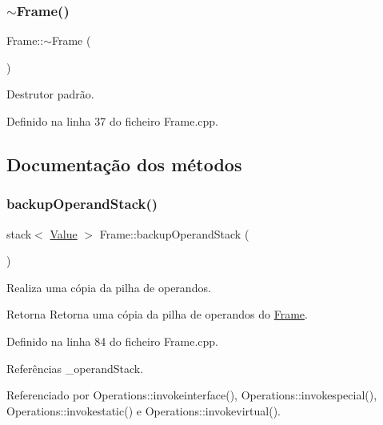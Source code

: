 \subsubsection{\texorpdfstring{$\sim$\+Frame()}{~Frame()}}
{\footnotesize\ttfamily Frame\+::$\sim$\+Frame (\begin{DoxyParamCaption}{ }\end{DoxyParamCaption})}



Destrutor padrão. 



Definido na linha 37 do ficheiro Frame.\+cpp.



\subsection{Documentação dos métodos}
\mbox{\label{classFrame_a874ac5162f805570d944a807ebf2bd40}} 
\subsubsection{\texorpdfstring{backup\+Operand\+Stack()}{backupOperandStack()}}
{\footnotesize\ttfamily stack$<$ \hyperlink{structValue}{Value} $>$ Frame\+::backup\+Operand\+Stack (\begin{DoxyParamCaption}{ }\end{DoxyParamCaption})}



Realiza uma cópia da pilha de operandos. 

\begin{DoxyReturn}{Retorna}
Retorna uma cópia da pilha de operandos do \hyperlink{classFrame}{Frame}. 
\end{DoxyReturn}


Definido na linha 84 do ficheiro Frame.\+cpp.



Referências \+\_\+operand\+Stack.



Referenciado por Operations\+::invokeinterface(), Operations\+::invokespecial(), Operations\+::invokestatic() e Operations\+::invokevirtual().

\mbox{\label{classFrame_a93c26ae659c3f1b11837a0e9942acb20}} 
